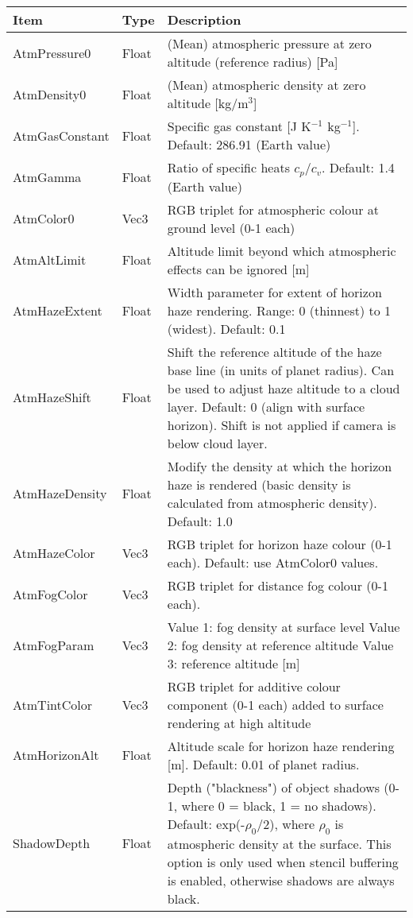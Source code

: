 \documentclass[Orbiter Developer Manual.tex]{subfiles}
\begin{document}
	\begin{longtable}{ |p{}|p{}|p{}| }
	\hline\rule{0pt}{2ex}
	\textbf{Item} & \textbf{Type} & \textbf{Description}\\
	\hline\rule{0pt}{2ex}
	AtmPressure0 & Float & (Mean) atmospheric pressure at zero altitude (reference radius) [Pa]\\
	\hline\rule{0pt}{2ex}
	AtmDensity0 & Float & (Mean) atmospheric density at zero altitude [kg/m$^{3}$]\\
	\hline\rule{0pt}{2ex}
	AtmGasConstant & Float & Specific gas constant [J K$^{-1}$ kg$^{-1}$]. Default: 286.91 (Earth value)\\
	\hline\rule{0pt}{2ex}
	AtmGamma & Float & Ratio of specific heats $c_{p}$/$c_{v}$. Default: 1.4 (Earth value)\\
	\hline\rule{0pt}{2ex}
	AtmColor0 & Vec3 & RGB triplet for atmospheric colour at ground level (0-1 each)\\
	\hline\rule{0pt}{2ex}
	AtmAltLimit & Float & Altitude limit beyond which atmospheric effects can be ignored [m]\\
	\hline\rule{0pt}{2ex}
	AtmHazeExtent & Float & Width parameter for extent of horizon haze rendering. Range: 0 (thinnest) to 1 (widest). Default: 0.1\\
	\hline\rule{0pt}{2ex}
	AtmHazeShift & Float & Shift the reference altitude of the haze base line (in units of planet radius). Can be used to adjust haze altitude to a cloud layer. Default: 0 (align with surface horizon). Shift is not applied if camera is below cloud layer.\\
	\hline\rule{0pt}{2ex}
	AtmHazeDensity & Float & Modify the density at which the horizon haze is rendered (basic density is calculated from atmospheric density). Default: 1.0\\
	\hline\rule{0pt}{2ex}
	AtmHazeColor & Vec3 & RGB triplet for horizon haze colour (0-1 each). Default: use AtmColor0 values.\\
	\hline\rule{0pt}{2ex}
	AtmFogColor & Vec3 & RGB triplet for distance fog colour (0-1 each).\\
	\hline\rule{0pt}{2ex}
	AtmFogParam & Vec3 & Value 1: fog density at surface level\newline
	Value 2: fog density at reference altitude\newline
	Value 3: reference altitude [m]\\
	\hline\rule{0pt}{2ex}
	AtmTintColor & Vec3 & RGB triplet for additive colour component (0-1 each) added to surface rendering at high altitude\\
	\hline\rule{0pt}{2ex}
	AtmHorizonAlt & Float & Altitude scale for horizon haze rendering [m]. Default: 0.01 of planet radius.\\
	\hline\rule{0pt}{2ex}
	ShadowDepth & Float & Depth ("blackness") of object shadows (0-1, where 0 = black, 1 = no shadows). Default: exp(-$\rho_{0}$/2), where $\rho_{0}$ is atmospheric density at the surface. This option is only used when stencil buffering is enabled, otherwise shadows are always black.\\
	\hline
	\end{longtable}
\end{document}
